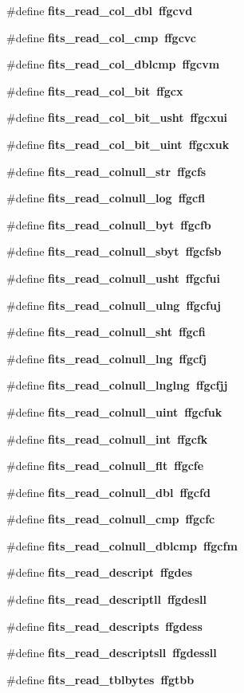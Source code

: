 \begin{CompactItemize}
\item 
\#define \bf{fits\_\-read\_\-col\_\-dbl}~ffgcvd
\item 
\#define \bf{fits\_\-read\_\-col\_\-cmp}~ffgcvc
\item 
\#define \bf{fits\_\-read\_\-col\_\-dblcmp}~ffgcvm
\item 
\#define \bf{fits\_\-read\_\-col\_\-bit}~ffgcx
\item 
\#define \bf{fits\_\-read\_\-col\_\-bit\_\-usht}~ffgcxui
\item 
\#define \bf{fits\_\-read\_\-col\_\-bit\_\-uint}~ffgcxuk
\item 
\#define \bf{fits\_\-read\_\-colnull\_\-str}~ffgcfs
\item 
\#define \bf{fits\_\-read\_\-colnull\_\-log}~ffgcfl
\item 
\#define \bf{fits\_\-read\_\-colnull\_\-byt}~ffgcfb
\item 
\#define \bf{fits\_\-read\_\-colnull\_\-sbyt}~ffgcfsb
\item 
\#define \bf{fits\_\-read\_\-colnull\_\-usht}~ffgcfui
\item 
\#define \bf{fits\_\-read\_\-colnull\_\-ulng}~ffgcfuj
\item 
\#define \bf{fits\_\-read\_\-colnull\_\-sht}~ffgcfi
\item 
\#define \bf{fits\_\-read\_\-colnull\_\-lng}~ffgcfj
\item 
\#define \bf{fits\_\-read\_\-colnull\_\-lnglng}~ffgcfjj
\item 
\#define \bf{fits\_\-read\_\-colnull\_\-uint}~ffgcfuk
\item 
\#define \bf{fits\_\-read\_\-colnull\_\-int}~ffgcfk
\item 
\#define \bf{fits\_\-read\_\-colnull\_\-flt}~ffgcfe
\item 
\#define \bf{fits\_\-read\_\-colnull\_\-dbl}~ffgcfd
\item 
\#define \bf{fits\_\-read\_\-colnull\_\-cmp}~ffgcfc
\item 
\#define \bf{fits\_\-read\_\-colnull\_\-dblcmp}~ffgcfm
\item 
\#define \bf{fits\_\-read\_\-descript}~ffgdes
\item 
\#define \bf{fits\_\-read\_\-descriptll}~ffgdesll
\item 
\#define \bf{fits\_\-read\_\-descripts}~ffgdess
\item 
\#define \bf{fits\_\-read\_\-descriptsll}~ffgdessll
\item 
\#define \bf{fits\_\-read\_\-tblbytes}~ffgtbb
\item 

\end{CompactItemize}

